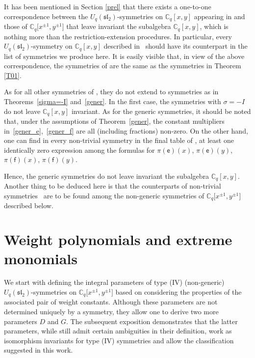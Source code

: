 \documentclass[10pt,a4paper]{amsart}
\numberwithin{equation}{section}
\begin{document}
\begin{Remark}It has been mentioned in Section \ref{prel} that there exists a one-to-one correspondence between the $U_q(\mathfrak{sl}_2)$-symmetries on $\mathbb{C}_q[x,y]$ appearing in \cite[Theorems 4.2--4.7]{DS} and those of $\mathbb{C}_q\big[x^{\pm 1},y^{\pm 1}\big]$ that leave invariant the subalgebra $\mathbb{C}_q[x,y]$, which is nothing more than the restriction-extension procedures. In particular, every $U_q(\mathfrak{sl}_2)$-symmetry on $\mathbb{C}_q[x,y]$ described in~\cite{DS} should have its counterpart in the list of symmetries we produce here. It is easily visible that, in view of the above correspondence, the symmetries of \cite[Theorem 4.2]{DS} are the same as the symmetries in Theorem \ref{T01}.

As for all other symmetries of \cite{DS}, they do not extend to symmetries as in Theorems~\ref{sigma=-I} and~\ref{gener}. In the first case, the symmetries with $\sigma=-I$ do not leave $\mathbb{C}_q[x,y]$ invariant. As for the generic symmetries, it should be noted that, under the assumptions of Theorem~\ref{gener}, the constant multipliers in~\eqref{gener_e},~\eqref{gener_f} are all (including fractions) non-zero. On the other hand, one can find in every non-trivial symmetry in the final table of \cite{DS}, at least one identically zero expression among the formulas for $\pi(\mathsf{e})(x)$, $\pi(\mathsf{e})(y)$, $\pi(\mathsf{f})(x)$, $\pi(\mathsf{f})(y)$.

Hence, the generic symmetries do not leave invariant the subalgebra $\mathbb{C}_q[x,y]$. Another thing to be deduced here is that the counterparts of non-trivial symmetries~\cite{DS} are to be found among the non-generic symmetries of $\mathbb{C}_q\big[x^{\pm 1},y^{\pm 1}\big]$ described below.
\end{Remark}


\section{Weight polynomials and extreme monomials}\label{wpem}

We start with defining the integral parameters of type (IV) (non-generic) $U_q(\mathfrak{sl}_2)$-symmetries on $\mathbb{C}_q\big[x^{\pm 1},y^{\pm 1}\big]$ based on considering the properties of the associated pair of weight constants. Although these parameters are not determined uniquely by a symmetry, they allow one to derive two more parameters $D$ and $G$. The subsequent exposition demonstrates that the latter para\-me\-ters, while still admit certain ambiguities in their definition, work as isomorphism invariants for type (IV) symmetries and allow the classification suggested in this work.
\end{document}
